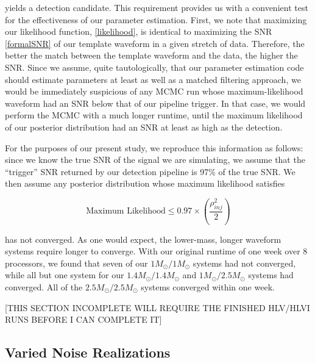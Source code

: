 \documentclass[11pt,a4paper]{emulateapj}
\newcommand{\carl}[1]{{\color{red}  #1}}
\begin{document}
\noindent  yields a detection candidate.  This requirement provides us with a convenient test for the effectiveness 
of our parameter estimation.  First, we note that maximizing our likelihood function, \eqref{likelihood},
is identical to maximizing the SNR \eqref{formalSNR} of our template waveform in a given stretch of data.
Therefore, the better the match between the template waveform and the data, the higher the SNR.  Since we
assume, quite tautologically, that our parameter estimation code should estimate parameters at least as 
well as a matched filtering approach, we would be immediately suspicious of any MCMC run whose 
maximum-likelihood waveform had an SNR below that of our pipeline trigger.   In that case, we would perform
the MCMC with a much longer runtime, until the maximum likelihood of our posterior distribution had an SNR
at least as high as the detection.

For the purposes of our present study, we reproduce this information as follows: since we know the true SNR
of the signal we are simulating, we assume that the ``trigger'' SNR returned by our detection pipeline is 
97\% of the true SNR.  We then assume any posterior distribution whose maximum likelihood satisfies

\begin{equation}
\text{Maximum Likelihood} \leq 0.97 \times \left(\frac{\rho_{inj}^2}{2}\right) 
\nonumber
\end{equation}

\noindent has not converged.  As one would expect, the lower-mass, longer waveform systems require longer 
to converge.  With our original runtime of one week over 8 processors, we found that seven of our 
$1M_{\odot}/1M_{\odot}$ systems had not converged, while all but one system for our $1.4M_{\odot}/1.4M_{\odot}$
and $1M_{\odot}/2.5M_{\odot}$ systems had converged.  All of the $2.5M_{\odot}/2.5M_{\odot}$ systems 
converged within one week.  

\carl{[THIS SECTION INCOMPLETE  WILL REQUIRE THE FINISHED HLV/HLVI RUNS BEFORE I CAN COMPLETE IT]}


\subsection{Varied Noise Realizations}
\label{noiseSection}
\end{document}
